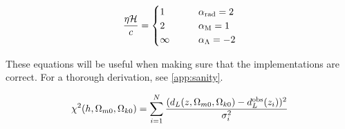     \begin{equation}
        \label{eq:m1:theory:sanity:eta_sanity}
        \frac{\eta\mathcal{H}}{c} = 
        \begin{cases}
            1 \qquad &\alpha_\mathrm{rad} = 2 \\
            2 \qquad &\alpha_\mathrm{M} = 1\\
            \infty \qquad &\alpha_\Lambda = -2
        \end{cases}
    \end{equation}

    These equations will be useful when making sure that the implementations are correct. For a thorough derivation, see \cref{app:sanity}.

   

    \begin{equation}\label{eq:m1:chi2_test_def}
        \chi^2(h, \Omega_{m0}, \Omega_{k0}) = \sum_{i=1}^N \frac{(d_L(z, \Omega_{m0}, \Omega_{k0}) - d_L^\mathrm{obs}(z_i))^2}{\sigma_i^2}
    \end{equation}


